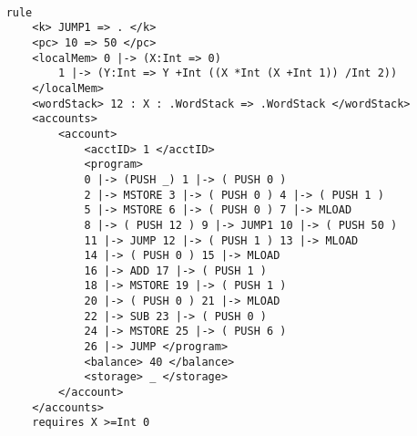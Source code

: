 \begin{verbatim}

    rule
        <k> JUMP1 => . </k>
        <pc> 10 => 50 </pc>
        <localMem> 0 |-> (X:Int => 0)
            1 |-> (Y:Int => Y +Int ((X *Int (X +Int 1)) /Int 2))
        </localMem>
        <wordStack> 12 : X : .WordStack => .WordStack </wordStack>
        <accounts>
            <account>
	            <acctID> 1 </acctID>
	            <program>
                0 |-> (PUSH _) 1 |-> ( PUSH 0 )
                2 |-> MSTORE 3 |-> ( PUSH 0 ) 4 |-> ( PUSH 1 )
                5 |-> MSTORE 6 |-> ( PUSH 0 ) 7 |-> MLOAD
                8 |-> ( PUSH 12 ) 9 |-> JUMP1 10 |-> ( PUSH 50 )
                11 |-> JUMP 12 |-> ( PUSH 1 ) 13 |-> MLOAD
                14 |-> ( PUSH 0 ) 15 |-> MLOAD
                16 |-> ADD 17 |-> ( PUSH 1 )
                18 |-> MSTORE 19 |-> ( PUSH 1 )
                20 |-> ( PUSH 0 ) 21 |-> MLOAD
                22 |-> SUB 23 |-> ( PUSH 0 )
                24 |-> MSTORE 25 |-> ( PUSH 6 )
                26 |-> JUMP </program>
	            <balance> 40 </balance>
	            <storage> _ </storage>
            </account>
        </accounts>
        requires X >=Int 0
\end{verbatim}
